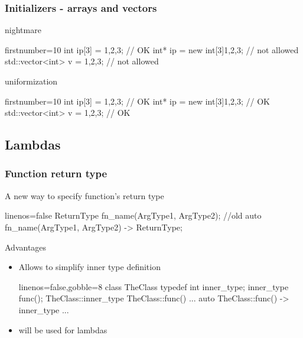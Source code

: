 \begin{frame}[fragile]
  \frametitle{Initializers - arrays and vectors}
  \begin{block}{ nightmare}
    \begin{cppcode*}{firstnumber=10}
     int ip[3] = {1,2,3};          // OK
     int* ip = new int[3]{1,2,3};  // not allowed
     std::vector<int> v = {1,2,3}; // not allowed
    \end{cppcode*}
  \end{block}
  \pause
  \begin{exampleblock}{ uniformization}
    \begin{cppcode*}{firstnumber=10}
     int ip[3] = {1,2,3};          // OK
     int* ip = new int[3]{1,2,3};  // OK
     std::vector<int> v = {1,2,3}; // OK
    \end{cppcode*}
  \end{exampleblock}
\end{frame}

\subsection[$\lambda$]{Lambdas}

\begin{frame}[fragile]
  \frametitle{Function return type}
  \begin{block}{A new way to specify function's return type}
    \begin{cppcode*}{linenos=false}
      ReturnType fn_name(ArgType1, ArgType2);  //old
      auto fn_name(ArgType1, ArgType2) -> ReturnType;
    \end{cppcode*}
  \end{block}
  \pause
  \begin{block}{Advantages}
    \begin{itemize}
    \item Allows to simplify inner type definition
      \begin{cppcode*}{linenos=false,gobble=8}
        class TheClass {
          typedef int inner_type;
          inner_type func();
        }
        TheClass::inner_type TheClass::func() {...}
        auto TheClass::func() -> inner_type {...}
      \end{cppcode*}
    \item will be used for lambdas
    \end{itemize}
  \end{block}
\end{frame}


